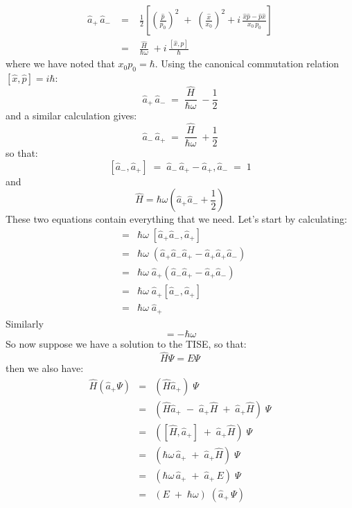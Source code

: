 \documentclass[12pt]{book}
\begin{document}
\begin{eqnarray*}
\hat{a}_{+}\, \hat{a}_{-} \; &=& \; \frac{1}{2} \left[
\left( \frac{\hat{p}}{p_0}\right)^2 \; + \; \left( \frac{\hat{x}}{x_0}\right)^2
+ i \, \frac{\hat{x}\hat{p} - \hat{p}\hat{x}}{x_0 \, p_0}
\right] \\[8pt]
&=& \; \frac{\hat{H}}{\hbar \omega} \; + i \, \frac{[\hat{x},\hat{p}]}{\hbar}
\end{eqnarray*}
where we have noted that $x_0 p_0 = \hbar$.  Using the canonical commutation relation $[\hat{x}, \hat{p}] = i\hbar$:
\begin{equation*}
\hat{a}_{+}\,\hat{a}_{-} \; = \; \frac{\hat{H}}{\hbar\omega} \; - \frac{1}{2}
\end{equation*}
and a similar calculation gives:
\begin{equation*}
\hat{a}_{-}\,\hat{a}_{+} \; = \; \frac{\hat{H}}{\hbar\omega} \; + \frac{1}{2}
\end{equation*}
so that:
\begin{equation}
\label{eqn:ladder-com}
[\hat{a}_-, \hat{a}_+] \; = \; \hat{a}_- \, \hat{a}_+ - \hat{a}_+, \hat{a}_- \; = \;  1
\end{equation}
and
\begin{equation}
\label{eqn:ladder-ham}
\hat{H} =  \hbar\omega \left( \hat{a}_+ \hat{a}_- + \frac{1}{2} \right)
\end{equation}
These two equations contain everything that we need.  Let's start by calculating:
\begin{eqnarray*}
[\hat{H}\,,\,\hat{a}_+] &=& \hbar \omega \; [\hat{a}_+ \hat{a}_-, \hat{a}_+]  \\
&=& \hbar \omega \; \left( \hat{a}_+ \hat{a}_- \hat{a}_+ - \hat{a}_+ \hat{a}_+ \hat{a}_- \right) \\
&=& \hbar \omega \; \hat{a}_+ (\hat{a}_- \hat{a}_+ - \hat{a}_+ \hat{a}_-)\\
&=& \hbar \omega \; \hat{a}_+ [\hat{a}_-, \hat{a}_+]\\
&=& \hbar \omega \; \hat{a}_+ 
\end{eqnarray*}
Similarly
\begin{equation*}
[\hat{H},\hat{a}_-] = -\hbar \omega 
\end{equation*}
So now suppose we have a solution to the TISE, so that:
$$\hat{H} \Psi = E \Psi$$
then we also have:
\begin{eqnarray*}
\hat{H} \left( \hat{a}_+ \Psi \right) &=& \left( \hat{H} \hat{a}_+ \right) \; \Psi\\
     &=& \left( \hat{H} \hat{a}_+ \; - \; \hat{a}_+ \hat{H} \; + \; \hat{a}_+ \hat{H} \right) \; \Psi\\
     &=& \left( [\hat{H}, \hat{a}_+] \; + \; \hat{a}_+ \hat{H} \right) \; \Psi\\
     &=& \left( \hbar\omega \, \hat{a}_+ \; + \; \hat{a}_+ \hat{H} \right) \; \Psi\\
     &=& \left( \hbar\omega \, \hat{a}_+ \; + \; \hat{a}_+ \, E \right) \; \Psi\\
     &=& \left( E \; + \; \hbar\omega \right) \; (\hat{a}_+ \, \Psi)\\
\end{eqnarray*}
\end{document}
